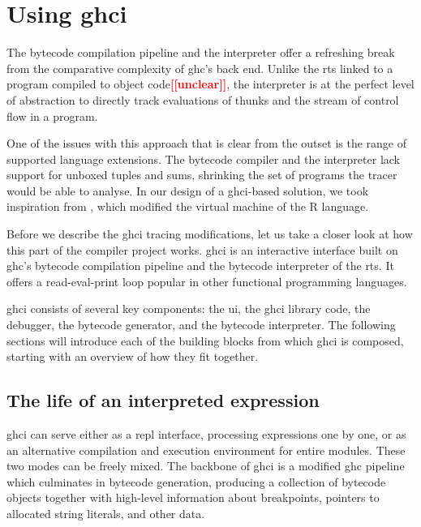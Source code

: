 \documentclass[thesis=B,english]{FITthesis}[2019/12/23]
\newcommand{\todo}[1]{\textcolor{red}{\textbf{[[#1]]}}}
\begin{document}
\section{Using \acrshort{ghci}} \label{sec:using-ghci}
The bytecode compilation pipeline and the interpreter offer a refreshing break
from the comparative complexity of \acrshort{ghc}'s back end. Unlike the
\acrshort{rts} linked to a program compiled to object code\todo{unclear}, the
interpreter is at the perfect level of abstraction to directly track
evaluations of thunks and the stream of control flow in a program.

One of the issues with this approach that is clear from the outset is the range
of supported language extensions. The bytecode compiler and the interpreter
lack support for un\-box\-ed tuples and sums, shrinking the set of programs the
tracer would be able to analyse. In our design of a \acrshort{ghci}-based
solution, we took inspiration from \cite{emp-study-laziness-r}, which modified
the virtual machine of the R language.

Before we describe the \acrshort{ghci} tracing modifications, let us take a
closer look at how this part of the compiler project works. \acrshort{ghci} is
an interactive interface built on \acrshort{ghc}'s bytecode compilation
pipeline and the bytecode interpreter of the \acrshort{rts}. It offers a
read-eval-print loop popular in other functional programming languages.

\acrshort{ghci} consists of several key components: the \acrshort{ui}, the
\acrshort{ghci} library code, the debugger, the bytecode generator, and the
bytecode interpreter. The following sections will introduce each of the
building blocks from which \acrshort{ghci} is composed, starting with an
overview of how they fit together.

\subsection*{The life of an interpreted expression}
\acrshort{ghci} can serve either as a \acrshort{repl} interface, processing
expressions one by one, or as an alternative compilation and execution
environment for entire modules. These two modes can be freely mixed. The
backbone of \acrshort{ghci} is a modified \acrshort{ghc} pipeline which
culminates in bytecode generation, producing a collection of bytecode objects
together with high-level information about breakpoints, pointers to allocated
string literals, and other data.
\end{document}
